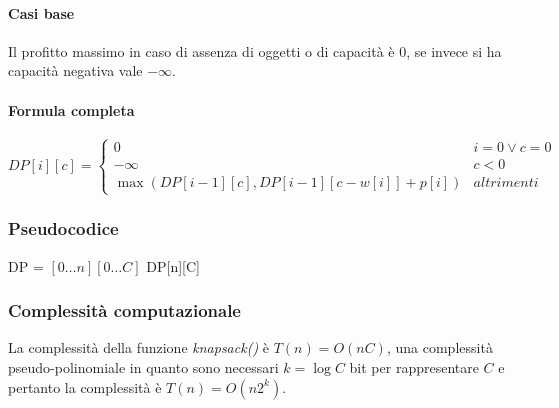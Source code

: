 \paragraph{Casi base}
Il profitto massimo in caso di assenza di oggetti o di capacit\`a \`e $0$, se invece si ha capacit\`a negativa vale $-\infty$. 
\paragraph{Formula completa}
$$
DP[i][c] =
\begin{cases}
0\quad & i = 0 \lor c = 0\\
-\infty & c<0\\
\max(DP[i-1][c], DP[i-1][c-w[i]]+p[i]) & altrimenti
\end{cases}
$$
\subsubsection{Pseudocodice}
\begin{algorithm}[H]
\DontPrintSemicolon
{}




\SetKwFunction{}{}
\SetKwFunction{}{}
\SetKwFunction{}{}
\SetKwFunction{}{}
\SetKwFunction{}{}

\caption{\protect\Int \protect{}}
\Int[][] DP = \New \Int$[0\dots n][0\dots C]$\;
\Return DP[n][C]
\end{algorithm}
\subsubsection{Complessit\`a computazionale}
La complessit\`a della funzione \emph{knapsack()} \`e $T(n) = O(nC)$, una complessit\`a pseudo-polinomiale in quanto sono necessari $k = \log C$ bit per 
rappresentare $C$ e pertanto la complessit\`a \`e $T(n) = O(n2^k)$.
